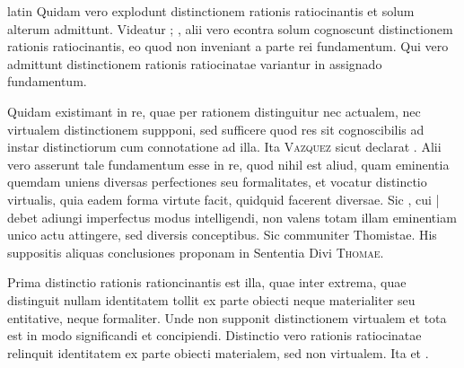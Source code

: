 \begin{otherlanguage*}{latin}
\pstart
 Quidam vero explodunt distinctionem rationis ratiocinantis et solum alterum admittunt. Videatur ; , alii vero econtra solum cognoscunt distinctionem rationis ratiocinantis, eo quod non inveniant a parte rei fundamentum. Qui vero admittunt distinctionem rationis ratiocinatae variantur in assignado fundamentum. 
\pend

\pstart
 Quidam existimant in re, quae per rationem distinguitur nec actualem, nec virtualem distinctionem suppponi, sed sufficere quod res sit cognoscibilis ad instar distinctiorum cum connotatione ad illa. Ita \textsc{Vazquez} sicut declarat . Alii vero asserunt tale fundamentum esse in re, quod nihil est aliud, quam eminentia quemdam uniens diversas perfectiones seu formalitates, et vocatur distinctio virtualis, quia eadem forma virtute facit, quidquid facerent diversae. Sic , cui \textnormal{|} debet adiungi imperfectus modus intelligendi, non valens totam illam eminentiam unico actu attingere, sed diversis conceptibus. Sic communiter Thomistae. His suppositis aliquas conclusiones proponam in Sententia Divi \textsc{Thomae}. 
\pend

\pstart
 Prima distinctio rationis rationcinantis est illa, quae inter extrema, quae distinguit nullam identitatem tollit ex parte obiecti neque materialiter seu entitative, neque formaliter. Unde non supponit distinctionem virtualem et tota est in modo significandi et concipiendi. Distinctio vero rationis ratiocinatae relinquit identitatem ex parte obiecti materialem, sed non virtualem. Ita  et . 
\pend


\end{otherlanguage*}
